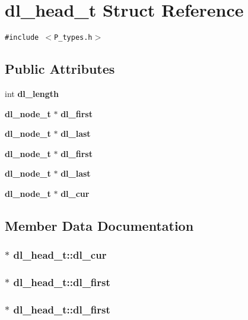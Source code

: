 \section{dl\_\-head\_\-t  Struct Reference}
\label{structdl__head__t}
{\tt \#include $<$P\_\-types.h$>$}

\subsection*{Public Attributes}
\begin{CompactItemize}
\item 
int {\bf dl\_\-length}
\item 
{\bf dl\_\-node\_\-t} $\ast$ {\bf dl\_\-first}
\item 
{\bf dl\_\-node\_\-t} $\ast$ {\bf dl\_\-last}
\item 
{\bf dl\_\-node\_\-t} $\ast$ {\bf dl\_\-first}
\item 
{\bf dl\_\-node\_\-t} $\ast$ {\bf dl\_\-last}
\item 
{\bf dl\_\-node\_\-t} $\ast$ {\bf dl\_\-cur}
\end{CompactItemize}


\subsection{Member Data Documentation}
\subsubsection{$\ast$ dl\_\-head\_\-t::dl\_\-cur}\label{structdl__head__t_m5}


\subsubsection{$\ast$ dl\_\-head\_\-t::dl\_\-first}\label{structdl__head__t_m3}


\subsubsection{$\ast$ dl\_\-head\_\-t::dl\_\-first}\label{structdl__head__t_m1}


